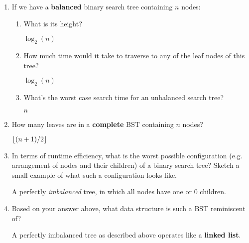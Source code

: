 \begin{enumerate}
	\item If we have a \textbf{balanced} binary search tree containing $n$ nodes:
		\begin{enumerate}
		    \item What is its height? \\
			\begin{answer}
				$\log_2(n)$
			\end{answer}
		    \item How much time would it take to traverse to any of the leaf nodes of this tree? \\
			\begin{answer}
				$\log_2(n)$
			\end{answer}
		    \item What's the worst case search time for an unbalanced search tree? \\
			\begin{answer}
				$n$
			\end{answer}
		\end{enumerate}
	\item How many leaves are in a \textbf{complete} BST containing $n$ nodes? \\
		\begin{answer}
			$\floor*{(n+1)/2}$
		\end{answer}
	\item In terms of runtime efficiency, what is the worst possible configuration (e.g. arrangement of nodes and their children) of a binary search tree? Sketch a small example of what such a configuration looks like. \\
		\begin{answer}
			A perfectly \textit{imbalanced} tree, in which all nodes have one or 0 children. \\

			
			
		\end{answer}
	\item Based on your answer above, what data structure is such a BST reminiscent of? \\
		\begin{answer}
			A perfectly imbalanced tree as described above operates like a \textbf{linked list}.
		\end{answer}
\end{enumerate}
